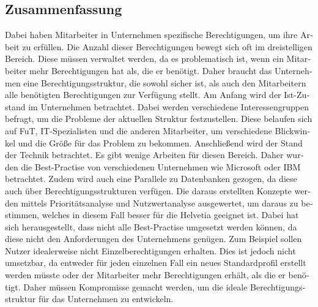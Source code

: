 \begin{otherlanguage}{ngerman}
	\chapter*{Zusammenfassung}
Dabei haben Mitarbeiter in Unternehmen spezifische Berechtigungen, um ihre Arbeit zu erfüllen.
Die Anzahl dieser Berechtigungen bewegt sich oft im dreistelligen Bereich.
Diese müssen verwaltet werden, da es problematisch ist, wenn ein Mitarbeiter mehr Berechtigungen hat als, die er benötigt.
Daher braucht das Unternehmen eine Berechtigungsstruktur, die sowohl sicher ist, als auch den Mitarbeitern alle benötigten Berechtigungen zur Verfügung stellt.
\newline
Am Anfang wird der Ist-Zustand im Unternehmen betrachtet.
Dabei werden verschiedene Interessengruppen befragt, um die Probleme der aktuellen Struktur festzustellen.
Diese belaufen sich auf \ac{FuT}, IT-Spezialisten und die anderen Mitarbeiter, um verschiedene Blickwinkel und die Größe für das Problem zu bekommen.
Anschließend wird der Stand der Technik betrachtet.
Es gibt wenige Arbeiten für diesen Bereich.
Daher wurden die Best-Practise von verschiedenen Unternehmen wie Microsoft oder IBM betrachtet.
Zudem wird auch eine Parallele zu Datenbanken gezogen, da diese auch über Berechtigungsstrukturen verfügen.
Die daraus erstellten Konzepte werden mittels Prioritätsanalyse und Nutzwertanalyse ausgewertet, um daraus zu bestimmen, welches in diesem Fall besser für die Helvetia geeignet ist.
\newline
Dabei hat sich herausgestellt, dass nicht alle Best-Practise umgesetzt werden können, da diese nicht den Anforderungen des Unternehmens genügen.
Zum Beispiel sollen Nutzer idealerweise nicht Einzelberechtigungen erhalten.
Dies ist jedoch nicht umsetzbar, da entweder für jeden einzelnen Fall ein neues Standardprofil erstellt werden müsste oder der Mitarbeiter mehr Berechtigungen erhält, als die er benötigt.
Daher müssen Kompromisse gemacht werden, um die ideale Berechtigungsstruktur für das Unternehmen zu entwickeln.
\end{otherlanguage}
